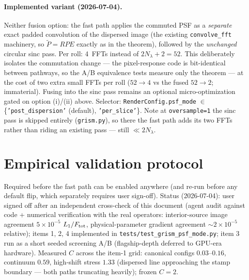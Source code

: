 \documentclass[11pt]{article}
\newcommand{\code}[1]{\texttt{#1}}
\begin{document}
\paragraph{Implemented variant (2026-07-04).} Neither fusion option:
the fast path applies the commuted PSF as a \emph{separate} exact padded
convolution of the dispersed image (the existing \code{convolve\_fft}
machinery, so $\tilde P = R P E$ exactly as in the theorem), followed by
the \emph{unchanged} circular sinc pass. Per roll: 4~FFTs instead of
$2N_\lambda + 2 = 52$. This deliberately isolates the commutation change
--- the pixel-response code is bit-identical between pathways, so the A/B
equivalence tests measure only the theorem --- at the cost of two extra
small FFTs per roll ($52 \to 4$ vs the fused $52 \to 2$; immaterial).
Fusing into the sinc pass remains an optional micro-optimization gated on
option (i)/(ii) above. Selector: \code{RenderConfig.psf\_mode}
$\in$ \{\code{'post\_dispersion'} (default), \code{'per\_slice'}\}. Note at
\code{oversample=1} the sinc pass is skipped entirely
(\code{grism.py}), so there the fast path adds its two FFTs rather than
riding an existing pass --- still $\ll 2N_\lambda$.

\section{Empirical validation protocol}
\label{sec:protocol}

Required before the fast path can be enabled anywhere (and re-run before any
default flip, which separately requires user sign-off). Status
(2026-07-04): user signed off after an independent cross-check of this
document (agent audit against code + numerical verification with the real
operators: interior-source image agreement $5\times10^{-5}$ $L_1/F_{\rm
tot}$, physical-parameter gradient agreement $\sim2\times10^{-5}$
relative); items 1, 2, 4 implemented in
\code{tests/test\_grism\_psf\_mode.py}; item 3 run as a short seeded
screening A/B (flagship-depth deferred to GPU-era hardware). Measured $C$
across the item-1 grid: canonical configs $0.03$--$0.16$, continuum $0.59$,
high-shift stress $1.33$ (dispersed line approaching the stamp boundary
--- both paths truncating heavily); frozen $C = 2$.
\end{document}
